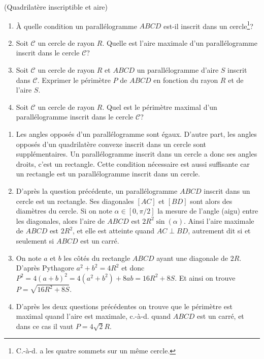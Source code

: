 \documentclass[a4paper,12pt,reqno]{amsart}
\begin{document}
\sisujet{\bigskip}
\begin{exo} (Quadrilatère inscriptible et aire)

  \begin{enumerate}
    \item À quelle condition un parallélogramme $ABCD$ est-il inscrit dans un cercle\footnote{C.-à-d. a les quatre sommets sur un même cercle.}?
    \item Soit $\mathcal{C}$ un cercle de rayon $R$. Quelle est l'aire maximale d'un parallélogramme inscrit dans le cercle $\mathcal{C}$?
    \item Soit $\mathcal{C}$ un cercle de rayon $R$ et $ABCD$ un parallélogramme d'aire $S$ inscrit dans $\mathcal{C}$. Exprimer le périmètre $P$ de $ABCD$ en fonction du rayon $R$ et de l'aire $S$.
    \item Soit $\mathcal{C}$ un cercle de rayon $R$. Quel est le périmètre maximal d'un parallélogramme inscrit dans le cercle $\mathcal{C}$?
  \end{enumerate}
\end{exo}

\begin{solution}

  \begin{enumerate}
     \item Les angles opposés d'un parallélogramme sont égaux. D'autre part, les angles opposés d'un quadrilatère convexe inscrit dans un cercle sont supplémentaires. Un parallélogramme inscrit dans un cercle a donc ses angles droits, c'est un rectangle. Cette condition nécessaire est aussi suffisante car un rectangle est un parallélogramme inscrit dans un cercle.
     \item D'après la question précédente, un parallélogramme $ABCD$ inscrit dans un cercle est un rectangle. Ses diagonales $[AC]$ et $[BD]$ sont alors des diamètres du cercle. Si on note $\alpha \in [0,\pi/2] $ la mesure de l'angle (aigu) entre les diagonales, alors l'aire de $ABCD$ est $2R^{2}\sin(\alpha)$. Ainsi l'aire maximale de $ABCD$ est $2R^{2}$, et elle est atteinte quand $AC\perp BD$, autrement dit si et seulement si $ABCD$ est un carré.
     \item On note $a$ et $b$ les côtés du rectangle $ABCD$ ayant une diagonale de $2R$. D'après Pythagore $a^{2}+b^{2} = 4R^{2}$ et donc $P^{2} = 4(a+b)^{2} = 4(a^2+b^2) + 8ab = 16R^{2}+8S$. Et ainsi on trouve $P = \sqrt{16R^{2}+8S}$.
     \item D'après les deux questions précédentes on trouve que le périmètre est maximal quand l'aire est maximale, c.-à-d. quand $ABCD$ est un carré, et dans ce cas il vaut $P = 4\sqrt{2}R$.
  \end{enumerate}
\end{solution}
\end{document}
